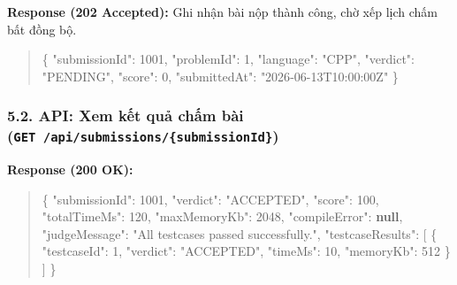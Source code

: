 \documentclass[12pt,a4paper]{article}
\renewcommand{\_}{\BreakableUnderscore}
\newenvironment{Shaded}{\vspace{3pt}\begin{quote}}{\end{quote}\vspace{3pt}}
\newcommand{\DataTypeTok}[1]{\textcolor[rgb]{0.56,0.13,0.00}{#1}}
\newcommand{\DecValTok}[1]{\textcolor[rgb]{0.25,0.63,0.44}{#1}}
\newcommand{\FunctionTok}[1]{\textcolor[rgb]{0.02,0.16,0.49}{#1}}
\newcommand{\KeywordTok}[1]{\textcolor[rgb]{0.00,0.44,0.13}{\textbf{#1}}}
\newcommand{\OtherTok}[1]{\textcolor[rgb]{0.00,0.44,0.13}{#1}}
\newcommand{\StringTok}[1]{\textcolor[rgb]{0.25,0.44,0.63}{#1}}
\begin{document}
\textbf{Response (202 Accepted):} Ghi nhận bài nộp thành công, chờ xếp lịch chấm bất đồng bộ.

\begin{Shaded}
\begin{Highlighting}[]
\FunctionTok{\{}
  \DataTypeTok{"submissionId"}\FunctionTok{:} \DecValTok{1001}\FunctionTok{,}
  \DataTypeTok{"problemId"}\FunctionTok{:} \DecValTok{1}\FunctionTok{,}
  \DataTypeTok{"language"}\FunctionTok{:} \StringTok{"CPP"}\FunctionTok{,}
  \DataTypeTok{"verdict"}\FunctionTok{:} \StringTok{"PENDING"}\FunctionTok{,}
  \DataTypeTok{"score"}\FunctionTok{:} \DecValTok{0}\FunctionTok{,}
  \DataTypeTok{"submittedAt"}\FunctionTok{:} \StringTok{"2026{-}06{-}13T10:00:00Z"}
\FunctionTok{\}}
\end{Highlighting}
\end{Shaded}

\subsubsection{\texorpdfstring{5.2. API: Xem kết quả chấm bài (\texttt{GET\ /api/submissions/\{submissionId\}})}{5.2. API: Xem kết quả chấm bài (GET /api/submissions/\{submissionId\})}}

\textbf{Response (200 OK):}

\begin{Shaded}
\begin{Highlighting}[]
\FunctionTok{\{}
  \DataTypeTok{"submissionId"}\FunctionTok{:} \DecValTok{1001}\FunctionTok{,}
  \DataTypeTok{"verdict"}\FunctionTok{:} \StringTok{"ACCEPTED"}\FunctionTok{,}
  \DataTypeTok{"score"}\FunctionTok{:} \DecValTok{100}\FunctionTok{,}
  \DataTypeTok{"totalTimeMs"}\FunctionTok{:} \DecValTok{120}\FunctionTok{,}
  \DataTypeTok{"maxMemoryKb"}\FunctionTok{:} \DecValTok{2048}\FunctionTok{,}
  \DataTypeTok{"compileError"}\FunctionTok{:} \KeywordTok{null}\FunctionTok{,}
  \DataTypeTok{"judgeMessage"}\FunctionTok{:} \StringTok{"All testcases passed successfully."}\FunctionTok{,}
  \DataTypeTok{"testcaseResults"}\FunctionTok{:} \OtherTok{[}
    \FunctionTok{\{}
      \DataTypeTok{"testcaseId"}\FunctionTok{:} \DecValTok{1}\FunctionTok{,}
      \DataTypeTok{"verdict"}\FunctionTok{:} \StringTok{"ACCEPTED"}\FunctionTok{,}
      \DataTypeTok{"timeMs"}\FunctionTok{:} \DecValTok{10}\FunctionTok{,}
      \DataTypeTok{"memoryKb"}\FunctionTok{:} \DecValTok{512}
    \FunctionTok{\}}
  \OtherTok{]}
\FunctionTok{\}}
\end{Highlighting}
\end{Shaded}
\end{document}
